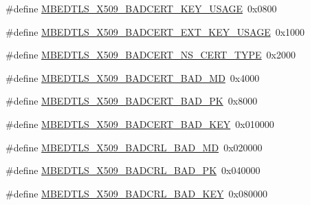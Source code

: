 \begin{DoxyCompactItemize}
\item 
\#define \hyperlink{group__x509__module_ga28705c8c3091a013487df25842249c0f}{M\-B\-E\-D\-T\-L\-S\-\_\-\-X509\-\_\-\-B\-A\-D\-C\-E\-R\-T\-\_\-\-K\-E\-Y\-\_\-\-U\-S\-A\-G\-E}~0x0800
\item 
\#define \hyperlink{group__x509__module_gac3dab3183efdbca7e988916e7fc1a02a}{M\-B\-E\-D\-T\-L\-S\-\_\-\-X509\-\_\-\-B\-A\-D\-C\-E\-R\-T\-\_\-\-E\-X\-T\-\_\-\-K\-E\-Y\-\_\-\-U\-S\-A\-G\-E}~0x1000
\item 
\#define \hyperlink{group__x509__module_gaa383ae441177fa7a16fb2313bb48bb10}{M\-B\-E\-D\-T\-L\-S\-\_\-\-X509\-\_\-\-B\-A\-D\-C\-E\-R\-T\-\_\-\-N\-S\-\_\-\-C\-E\-R\-T\-\_\-\-T\-Y\-P\-E}~0x2000
\item 
\#define \hyperlink{group__x509__module_ga41b54b526c11bf51cc431ef1a151816d}{M\-B\-E\-D\-T\-L\-S\-\_\-\-X509\-\_\-\-B\-A\-D\-C\-E\-R\-T\-\_\-\-B\-A\-D\-\_\-\-M\-D}~0x4000
\item 
\#define \hyperlink{group__x509__module_ga9332fa1e09a373cc56234525b14546c4}{M\-B\-E\-D\-T\-L\-S\-\_\-\-X509\-\_\-\-B\-A\-D\-C\-E\-R\-T\-\_\-\-B\-A\-D\-\_\-\-P\-K}~0x8000
\item 
\#define \hyperlink{group__x509__module_gaef5f9a34b327eb79750ebc3779e98282}{M\-B\-E\-D\-T\-L\-S\-\_\-\-X509\-\_\-\-B\-A\-D\-C\-E\-R\-T\-\_\-\-B\-A\-D\-\_\-\-K\-E\-Y}~0x010000
\item 
\#define \hyperlink{group__x509__module_gad3f810fb74f94164185b88b90fffa329}{M\-B\-E\-D\-T\-L\-S\-\_\-\-X509\-\_\-\-B\-A\-D\-C\-R\-L\-\_\-\-B\-A\-D\-\_\-\-M\-D}~0x020000
\item 
\#define \hyperlink{group__x509__module_ga182a6f1f465e566de7586e6ee8fa7c4e}{M\-B\-E\-D\-T\-L\-S\-\_\-\-X509\-\_\-\-B\-A\-D\-C\-R\-L\-\_\-\-B\-A\-D\-\_\-\-P\-K}~0x040000
\item 
\#define \hyperlink{group__x509__module_gac2947ead6fd1035296826110ca74a364}{M\-B\-E\-D\-T\-L\-S\-\_\-\-X509\-\_\-\-B\-A\-D\-C\-R\-L\-\_\-\-B\-A\-D\-\_\-\-K\-E\-Y}~0x080000
\end{DoxyCompactItemize}
